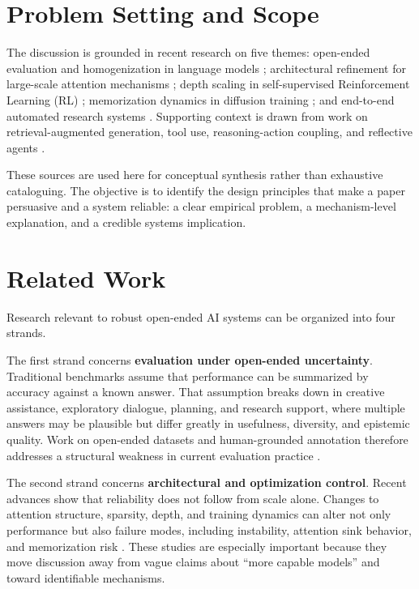 \section{Problem Setting and Scope}
The discussion is grounded in recent research on five themes: open-ended evaluation and homogenization in language models \citep{hivemind2025}; architectural refinement for large-scale attention mechanisms \citep{gated2025}; depth scaling in self-supervised Reinforcement Learning (RL) \citep{wang2025rl}; memorization dynamics in diffusion training \citep{diffusion2025}; and end-to-end automated research systems \citep{aiscientist2024,aiscientistv2_2025}. Supporting context is drawn from work on retrieval-augmented generation, tool use, reasoning-action coupling, and reflective agents \citep{lewis2020rag,schick2023toolformer,yao2023react,shinn2023reflexion}.

These sources are used here for conceptual synthesis rather than exhaustive cataloguing. The objective is to identify the design principles that make a paper persuasive and a system reliable: a clear empirical problem, a mechanism-level explanation, and a credible systems implication.

\section{Related Work}
Research relevant to robust open-ended AI systems can be organized into four strands.

The first strand concerns \textbf{evaluation under open-ended uncertainty}. Traditional benchmarks assume that performance can be summarized by accuracy against a known answer. That assumption breaks down in creative assistance, exploratory dialogue, planning, and research support, where multiple answers may be plausible but differ greatly in usefulness, diversity, and epistemic quality. Work on open-ended datasets and human-grounded annotation therefore addresses a structural weakness in current evaluation practice \citep{hivemind2025}.

The second strand concerns \textbf{architectural and optimization control}. Recent advances show that reliability does not follow from scale alone. Changes to attention structure, sparsity, depth, and training dynamics can alter not only performance but also failure modes, including instability, attention sink behavior, and memorization risk \citep{gated2025,wang2025rl,diffusion2025}. These studies are especially important because they move discussion away from vague claims about ``more capable models'' and toward identifiable mechanisms.

